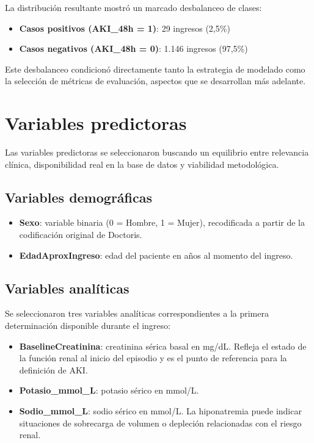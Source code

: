 \documentclass[12pt, a4paper, oneside]{report}
\begin{document}
La distribución resultante mostró un marcado desbalanceo de clases:

\begin{itemize}
    \item \textbf{Casos positivos (AKI\_48h = 1)}: 29 ingresos (2,5\%)
    \item \textbf{Casos negativos (AKI\_48h = 0)}: 1.146 ingresos (97,5\%)
\end{itemize}

Este desbalanceo condicionó directamente tanto la estrategia de modelado como la selección de métricas de evaluación, aspectos que se desarrollan más adelante.

\section{Variables predictoras}

Las variables predictoras se seleccionaron buscando un equilibrio entre relevancia clínica, disponibilidad real en la base de datos y viabilidad metodológica.

\subsection{Variables demográficas}

\begin{itemize}
    \item \textbf{Sexo}: variable binaria (0 = Hombre, 1 = Mujer), recodificada a partir de la codificación original de Doctoris.
    \item \textbf{EdadAproxIngreso}: edad del paciente en años al momento del ingreso.
\end{itemize}

\subsection{Variables analíticas}

Se seleccionaron tres variables analíticas correspondientes a la primera determinación disponible durante el ingreso:

\begin{itemize}
    \item \textbf{BaselineCreatinina}: creatinina sérica basal en mg/dL. Refleja el estado de la función renal al inicio del episodio y es el punto de referencia para la definición de AKI.
    \item \textbf{Potasio\_mmol\_L}: potasio sérico en mmol/L.
    \item \textbf{Sodio\_mmol\_L}: sodio sérico en mmol/L. La hiponatremia puede indicar situaciones de sobrecarga de volumen o depleción relacionadas con el riesgo renal.
\end{itemize}
\end{document}
